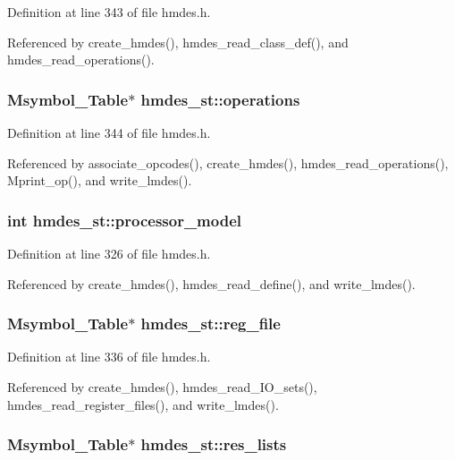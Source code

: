 Definition at line 343 of file hmdes.h.

Referenced by create\_\-hmdes(), hmdes\_\-read\_\-class\_\-def(), and hmdes\_\-read\_\-operations().
\subsubsection{\setlength{\rightskip}{0pt plus 5cm}\bf{Msymbol\_\-Table}$\ast$ \bf{hmdes\_\-st::operations}}\label{structhmdes__st_7244cda8df1b26517a5e5371207355fc}




Definition at line 344 of file hmdes.h.

Referenced by associate\_\-opcodes(), create\_\-hmdes(), hmdes\_\-read\_\-operations(), Mprint\_\-op(), and write\_\-lmdes().
\subsubsection{\setlength{\rightskip}{0pt plus 5cm}int \bf{hmdes\_\-st::processor\_\-model}}\label{structhmdes__st_90cd9923c96e9175630409e9fd7e9ff4}




Definition at line 326 of file hmdes.h.

Referenced by create\_\-hmdes(), hmdes\_\-read\_\-define(), and write\_\-lmdes().
\subsubsection{\setlength{\rightskip}{0pt plus 5cm}\bf{Msymbol\_\-Table}$\ast$ \bf{hmdes\_\-st::reg\_\-file}}\label{structhmdes__st_13fefe0fdd041c49948508cd1931528a}




Definition at line 336 of file hmdes.h.

Referenced by create\_\-hmdes(), hmdes\_\-read\_\-IO\_\-sets(), hmdes\_\-read\_\-register\_\-files(), and write\_\-lmdes().
\subsubsection{\setlength{\rightskip}{0pt plus 5cm}\bf{Msymbol\_\-Table}$\ast$ \bf{hmdes\_\-st::res\_\-lists}}\label{structhmdes__st_9ae40d45f69564985642878dd202a76b}




